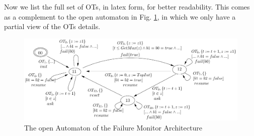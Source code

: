 \documentclass{llncs}
\begin{document}






Now we list the full set of OTs, in latex form, for better
readability. This comes as a complement to the open automaton in
Fig. \ref{schema:ArchFailure:OA-annex}, in which we only have a partial view
of the OTs details.

\begin{figure}[t]
  \centering
  \includegraphics[width=\columnwidth]{TimerOAFullDetailed}
  \caption{The open Automaton of the Failure Monitor Architecture}
  \label{schema:ArchFailure:OA-annex}
\end{figure}
\end{document}
